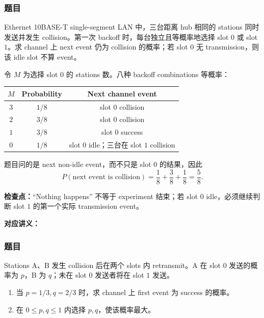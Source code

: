 \subsubsection*{题目}

Ethernet 10BASE-T single-segment LAN 中，三台距离 hub 相同的 stations 同时发送并发生 collision。第一次 backoff 时，每台独立且等概率地选择 slot $0$ 或 slot $1$。求 channel 上 next event 仍为 collision 的概率；若 slot $0$ 无 transmission，则该 idle slot 不算 event。

\begin{checkedsolution}
令 $M$ 为选择 slot $0$ 的 stations 数。八种 backoff combinations 等概率：
\begin{center}
\small
\begin{tabular}{@{}ccc@{}}
  \toprule
  $M$ & Probability & Next channel event \\
  \midrule
  $3$ & $1/8$ & slot $0$ collision \\
  $2$ & $3/8$ & slot $0$ collision \\
  $1$ & $3/8$ & slot $0$ success \\
  $0$ & $1/8$ & slot $0$ idle；三台在 slot $1$ collision \\
  \bottomrule
\end{tabular}
\end{center}
题目问的是 next non-idle event，而不只是 slot $0$ 的结果，因此
\[
  P(\text{next event is collision})
  =\frac18+\frac38+\frac18
  =\boxed{\frac58}.
\]
\end{checkedsolution}

\textbf{检查点：}“Nothing happens” 不等于 experiment 结束；若 slot $0$ idle，必须继续判断 slot $1$ 的第一个实际 transmission event。


\textbf{对应讲义：}

\subsubsection*{题目}

Stations A、B 发生 collision 后在两个 slots 内 retransmit。A 在 slot $0$ 发送的概率为 $p$，B 为 $q$；未在 slot $0$ 发送者将在 slot $1$ 发送。
\begin{enumerate}[label=(\roman*)]
  \item 当 $p=1/3,q=2/3$ 时，求 channel 上 first event 为 success 的概率。
  \item 在 $0\le p,q\le1$ 内选择 $p,q$，使该概率最大。
\end{enumerate}


